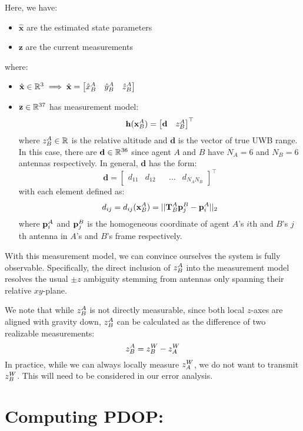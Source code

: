 \documentclass[12pt,letterpaper]{article}
\begin{document}
\noindent Here, we have:
\begin{itemize}
\item $\hat{\mathbf{x}}$ are the estimated state parameters
\item $\mathbf{z}$ are the current measurements
\end{itemize}
where:
\begin{itemize}
\item $\hat{\mathbf{x}} \in \mathbb{R}^3 \implies \hat{\mathbf{x}} = \begin{bmatrix}\hat{x}^{A}_{B} & \hat{y}^{A}_{B} & \hat{z}^{A}_{B}\end{bmatrix}$
\item $\mathbf{z} \in \mathbb{R}^{37}$ has measurement model:
$$\mathbf{h}(\mathbf{x}^{A}_{B}) = \begin{bmatrix} \mathbf{d} & z^{A}_{B} \end{bmatrix}^\top$$
where $z^{A}_{B} \in \mathbb{R}$ is the relative altitude and $\mathbf{d}$ is the vector of true UWB range. In this case, there are $\mathbf{d} \in \mathbb{R}^{36}$ since agent $A$ and $B$ have $N_A = 6$ and $N_B = 6$ antennas respectively. In general, $\mathbf{d}$ has the form:
$$\mathbf{d} = \begin{bmatrix} d_{11} & d_{12} & & \dots & d_{N_A N_B}\end{bmatrix}^\top$$
with each element defined as:
$$d_{ij} = d_{ij}(\mathbf{x}^{A}_{B}) = ||\mathbf{T}^{A}_{B}\mathbf{p}^{B}_{j} - \mathbf{p}^{A}_{i}||_2$$
where $\mathbf{p}^{A}_{i}$ and $\mathbf{p}^{B}_{j}$ is the homogeneous coordinate of agent $A$'s $i$th and $B$'s $j$th antenna in $A$'s and $B$'s frame respectively.
\end{itemize}
With this measurement model, we can convince ourselves the system is fully observable. Specifically, the direct inclusion of $z^{A}_{B}$ into the measurement model resolves the usual $\pm z$ ambiguity stemming from antennas only spanning their relative $xy$-plane.

We note that while $z^{A}_{B}$ is not directly measurable, since both local $z$-axes are aligned with gravity down, $z^{A}_{B}$ can be calculated as the difference of two realizable measurements:
$$z^{A}_{B} = z^{W}_{B} - z^{W}_{A}$$
In practice, while we can always locally measure $z^{W}_{A}$, we do not want to transmit $z^{W}_{B}$. This will need to be considered in our error analysis.

\clearpage
\section{Computing PDOP:}
\end{document}
